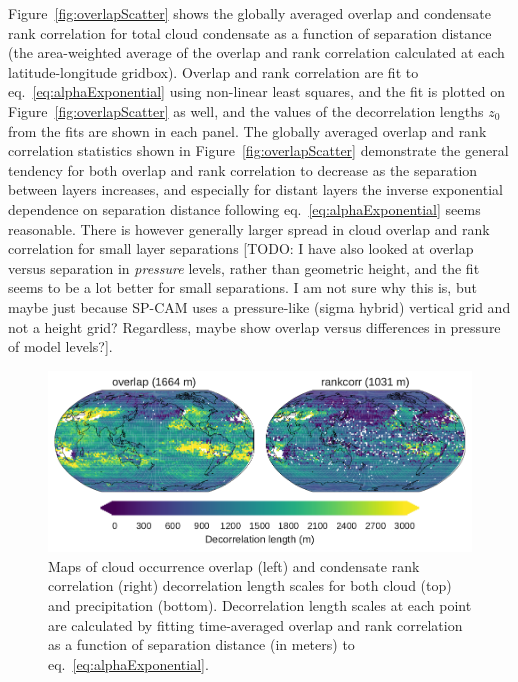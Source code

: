 Figure~\ref{fig:overlapScatter} shows the globally averaged overlap and
condensate rank correlation for total cloud condensate as a function of
separation distance (the area-weighted average of the overlap and rank
correlation calculated at each latitude-longitude gridbox). Overlap and
rank correlation are fit to eq.~\ref{eq:alphaExponential} using
non-linear least squares, and the fit is plotted on
Figure~\ref{fig:overlapScatter} as well, and the values of the
decorrelation lengths \(z_0\) from the fits are shown in each panel. The
globally averaged overlap and rank correlation statistics shown in
Figure~\ref{fig:overlapScatter} demonstrate the general tendency for
both overlap and rank correlation to decrease as the separation between
layers increases, and especially for distant layers the inverse
exponential dependence on separation distance following
eq.~\ref{eq:alphaExponential} seems reasonable. There is however
generally larger spread in cloud overlap and rank correlation for small
layer separations {[}TODO: I have also looked at overlap versus
separation in \emph{pressure} levels, rather than geometric height, and
the fit seems to be a lot better for small separations. I am not sure
why this is, but maybe just because SP-CAM uses a pressure-like (sigma
hybrid) vertical grid and not a height grid? Regardless, maybe show
overlap versus differences in pressure of model levels?{]}.

\begin{figure}[htbp]
\centering
\includegraphics{graphics/subgrid2_overlap_maps.pdf}
\caption{\label{fig:overlapMaps}Maps of cloud occurrence overlap (left)
and condensate rank correlation (right) decorrelation length scales for
both cloud (top) and precipitation (bottom). Decorrelation length scales
at each point are calculated by fitting time-averaged overlap and rank
correlation as a function of separation distance (in meters) to
eq.~\ref{eq:alphaExponential}.}\label{fig:overlapMaps}
\end{figure}

